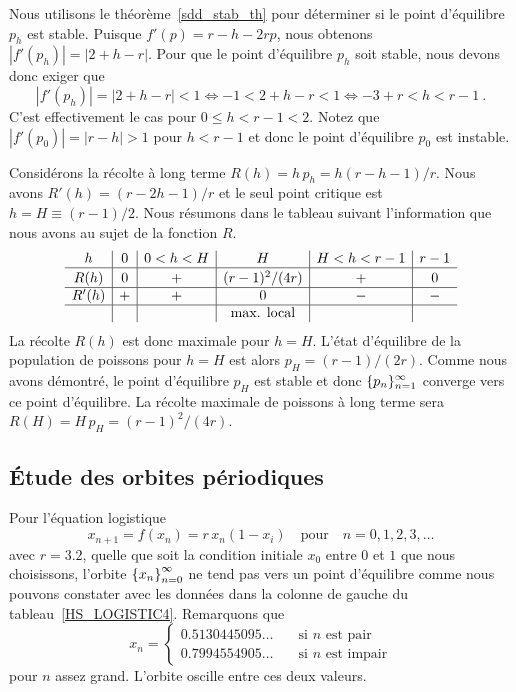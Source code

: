 {\begin{egg}
Nous utilisons le théorème~\ref{sdd_stab_th} pour déterminer si le point
d'équilibre $p_h$ est stable.  Puisque $f'(p) = r - h - 2r p$, nous
obtenons $|f'(p_h)| = |2 + h - r|$.  Pour que le point d'équilibre $p_h$
soit stable, nous devons donc exiger que
\[
|f'(p_h)| = |2 + h - r|<1 \Leftrightarrow -1 < 2 + h - r < 1
\Leftrightarrow -3 + r < h < r - 1 \ .
\]
C'est effectivement le cas pour $0 \leq h < r -1 < 2$.  Notez que
$|f'(p_0)| = |r - h| > 1$ pour $h < r -1$ et donc le point d'équilibre
$p_0$ est instable.

Considérons la récolte à long terme $R(h) = h\,p_h = h(r-h-1)/r$.
Nous avons $R'(h) = (r-2h-1)/r$ et le seul point critique est
$h = H \equiv (r-1)/2$.  Nous résumons dans le tableau suivant
l'information que nous avons au sujet de la fonction $R$.
\[
\begin{array}{c|c|c|c|c|c}
h & 0 & 0 < h < H & H & H < h < r-1 & r-1 \\
\hline
R(h) & 0 & + & \rule{0em}{1em} (r-1)^2/(4r) & + & 0 \\
\hline
R'(h) & + & + & 0 & - & - \\
\hline
 & & & \text{max. local} & & \\
\end{array}
\]
La récolte $R(h)$ est donc maximale pour $h = H$.  L'état d'équilibre
de la population de poissons pour $h = H$ est alors
$p_H = (r-1)/(2r)$.  Comme nous avons démontré, le point d'équilibre 
$p_H$ est stable et donc $\displaystyle \{p_n\}_{n=1}^\infty$ converge vers
ce point d'équilibre.  La récolte maximale de poissons à long terme
sera $R(H) = H\,p_H = (r-1)^2/(4r)$.
\label{discrete_fish_probl}
\end{egg}

\subsection{Étude des orbites périodiques \theory}

\begin{egg}
Pour l'équation logistique
\[
x_{n+1} = f(x_n) = r\, x_n(1-x_i) \quad \text{pour} \quad n=0, 1, 2, 3, \ldots
\]
avec $r=3.2$, quelle que soit la condition initiale $x_0$ entre $0$ et
$1$ que nous choisissons, l'orbite
$\displaystyle \left\{ x_n\right\}_{n=0}^\infty$ ne tend pas vers un
point d'équilibre comme nous pouvons constater avec les données dans la
colonne de gauche du tableau~\ref{HS_LOGISTIC4}.  Remarquons que
\[
x_n =
\begin{cases}
0.5130445095\ldots &\quad \text{si $n$ est pair} \\
0.7994554905\ldots &\quad \text{si $n$ est impair}
\end{cases}
\]
pour $n$ assez grand.  L'orbite oscille entre ces deux valeurs.
\label{eggper1}
\end{egg}

}
